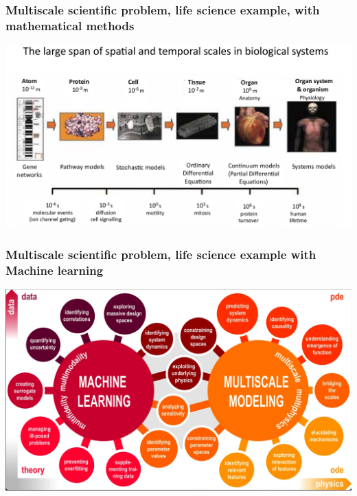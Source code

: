 \documentclass{beamer}
\begin{document}
\begin{frame}
\frametitle{Multiscale scientific problem, life science example, with mathematical methods}


\centerline{\includegraphics[width=1.05\linewidth]{figures/science1.png}}

\end{frame}


\begin{frame}
\frametitle{Multiscale scientific problem, life science example with Machine learning}


\centerline{\includegraphics[width=1.05\linewidth]{figures/science3.png}}

\end{frame}
\end{document}

